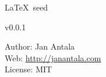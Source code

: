 \setlength{\parindent}{0cm}
\thispagestyle{empty}

\vspace*{\fill}

\begin{center}

  \begin{LARGE}
    \textmd{\LaTeX\ seed}
  \end{LARGE}

  \vspace*{0.5cm}

  \begin{Large}
  v0.0.1
  \end{Large}
  

\end{center}

\vspace*{\fill}

\begin{flushleft}
\large{Author: Jan Antala} \\
\large{Web: \url{http://janantala.com}} \\
\large{License: MIT} \\
\end{flushleft}